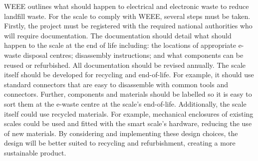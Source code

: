 WEEE outlines what should happen to electrical and electronic waste to reduce landfill waste. For the scale to comply with WEEE, several steps must be taken. Firstly, the project must be registered with the required national authorities who will require documentation. The documentation should detail what should happen to the scale at the end of life including: the locations of appropriate e-waste disposal centres; disassembly instructions; and what components can be reused or refurbished. All documentation should be revised annually. The scale itself should be developed for recycling and end-of-life. For example, it should use standard connectors that are easy to disassemble with common tools and connectors. Further, components and materials should be labelled so it is easy to sort them at the e-waste centre at the scale’s end-of-life. Additionally, the scale itself could use recycled materials. For example, mechanical enclosures of existing scales could be used and fitted with the smart scale’s hardware, reducing the use of new materials. By considering and implementing these design choices, the design will be better suited to recycling and refurbishment, creating a more sustainable product.

